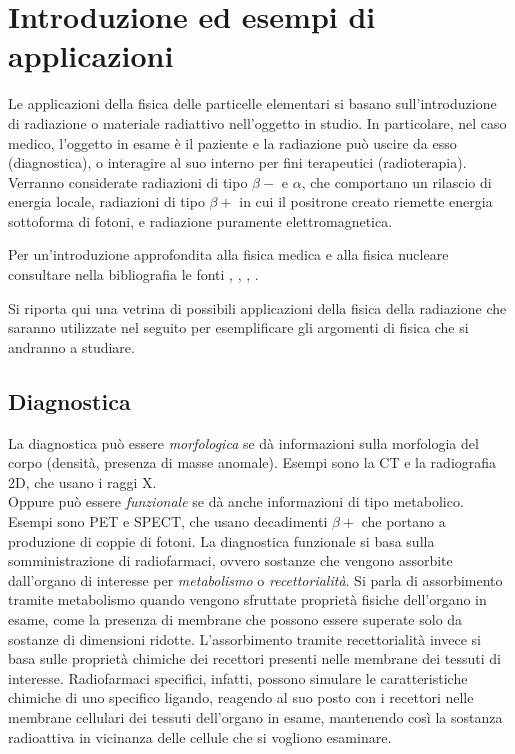 
\chapter{Introduzione ed esempi di applicazioni}

Le applicazioni della fisica delle particelle elementari si basano sull'introduzione di radiazione o materiale radiattivo nell'oggetto in studio. In particolare, nel caso medico, l'oggetto in esame è il paziente e la radiazione può uscire da esso (diagnostica), o interagire al suo interno per fini terapeutici (radioterapia).
Verranno considerate radiazioni di tipo $\beta-$ e $\alpha$, che comportano un rilascio di energia locale, radiazioni di tipo $\beta+$ in cui il positrone creato riemette energia sottoforma di fotoni, e radiazione puramente elettromagnetica.

Per un'introduzione approfondita alla fisica medica e alla fisica nucleare consultare nella bibliografia le fonti \cite{ENMP} \cite{NMP}, \cite{CLA}, \cite{Corvisiero3}, \cite{Nutshell}.

Si riporta qui una vetrina di possibili applicazioni della fisica della radiazione che saranno utilizzate nel seguito per esemplificare gli argomenti di fisica che si andranno a studiare.

\section{Diagnostica}

La diagnostica può essere \emph{morfologica} se dà informazioni sulla morfologia del corpo (densità, presenza di masse anomale). Esempi sono la CT e la radiografia 2D, che usano i raggi X.\\
Oppure può essere \emph{funzionale} se dà anche informazioni di tipo metabolico. Esempi sono PET e SPECT, che usano decadimenti $\beta+$ che portano a produzione di coppie di fotoni.
La diagnostica funzionale si basa sulla somministrazione di radiofarmaci, ovvero sostanze che vengono assorbite dall'organo di interesse per \emph{metabolismo} o \emph{recettorialità}. Si parla di assorbimento tramite metabolismo quando vengono sfruttate proprietà fisiche dell'organo in esame, come la presenza di membrane che possono essere superate solo da sostanze di dimensioni ridotte. L'assorbimento tramite recettorialità invece si basa sulle proprietà chimiche dei recettori presenti nelle membrane dei tessuti di interesse. Radiofarmaci specifici, infatti, possono simulare le caratteristiche chimiche di uno specifico ligando, reagendo al suo posto con i recettori nelle membrane cellulari dei tessuti dell'organo in esame, mantenendo così la sostanza radioattiva in vicinanza delle cellule che si vogliono esaminare.

